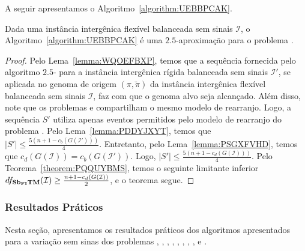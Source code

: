 A seguir apresentamos o Algoritmo~\ref{algorithm:UEBBPCAK}.



\begin{theorem}\label{theorem:DWYTBIPX}
Dada uma instância intergênica flexível balanceada sem sinais $\mathcal{I}$, o Algoritmo~\ref{algorithm:UEBBPCAK} é uma $2.5$-aproximação para o problema \SbFIT{}.
\end{theorem}
\begin{proof}
Pelo Lema~\ref{lemma:WQOEFBXP}, temos que a sequência fornecida pelo algoritmo $2.5$-\SbIT{} para a instância intergênica rígida balanceada sem sinais $\mathcal{I'}$, se aplicada no genoma de origem $(\pi,\breve\pi)$ da instância intergênica flexível balanceada sem sinais $\mathcal{I}$, faz com que o genoma alvo seja alcançado. Além disso, note que os problemas \SbITM{} e \SbFITM{} compartilham o mesmo modelo de rearranjo. Logo, a sequência $S'$ utiliza apenas eventos permitidos pelo modelo de rearranjo do problema \SbFITM{}. Pelo Lema~\ref{lemma:PDDYJXYT}, temos que $|S'| \le \frac{5({n+1} - c_b(G(\mathcal{I}')))}{4}$. Entretanto, pelo Lema~\ref{lemma:PSGXFVHD}, temos que $c_d(G(\mathcal{I})) = c_b(G(\mathcal{I}'))$. Logo, $|S'| \le \frac{5({n+1} - c_d(G(\mathcal{I})))}{4}$. Pelo Teorema~\ref{theorem:PQQUYBMS}, temos o seguinte limitante inferior $df_{\textbf{Sb\textsubscript{FI}TM}}(\mathcal{I}) \ge \frac{{n+1} - c_d(G(\mathcal{I}))}{2}$, e o teorema segue.
\end{proof}

\subsubsection{Resultados Práticos}\label{subsubsection:PWLZZAVH}

Nesta seção, apresentamos os resultados práticos dos algoritmos apresentados para a variação sem sinas dos problemas \SbFIR{}, \SbFIRI{}, \SbFIRM{}, \SbFIRMI{}, \SbFIRT{}, \SbFIRTI{}, \SbFIRTM{}, \SbFIRTMI{}, \SbFIT{} e \SbFITM{}.

